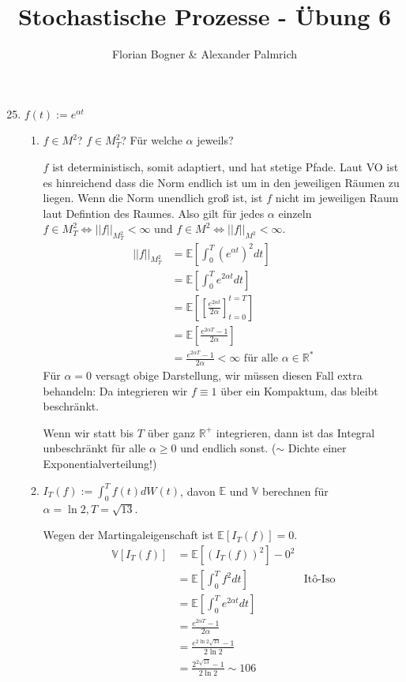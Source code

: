 \documentclass[a4paper,11pt,notitlepage,fullpage]{article}
\newcommand{\E}{\mathbb E}
\newcommand{\Ee}[1]{\mathbb E\left[#1\right]}
\newcommand{\V}{\mathbb V}
\newcommand{\Vv}[1]{\mathbb V\left[#1\right]}
\newcommand{\norm}[2]{\left|\left|{#1}\right|\right|_{#2}}
\begin{document}
\author{Florian Bogner \& Alexander Palmrich}
\title{Stochastische Prozesse - Übung 6}
\maketitle

\begin{enumerate}
\setcounter{enumi}{24}


\item $f(t):=e^{\alpha t}$
\begin{enumerate}
\item $f\in M^2$? $f\in M^2_T$? Für welche $\alpha$ jeweils?

$f$ ist deterministisch, somit adaptiert, und hat stetige Pfade. Laut VO ist es hinreichend dass die Norm endlich ist um in den jeweiligen Räumen zu liegen. Wenn die Norm unendlich groß ist, ist $f$ nicht im jeweiligen Raum laut Defintion des Raumes. Also gilt für jedes $\alpha$ einzeln $f\in M^2_T \Leftrightarrow \norm{f}{M^2_T}<\infty$ und $f\in M^2 \Leftrightarrow \norm{f}{M^2}<\infty$.
\begin{align*}
\norm{f}{M^2_T} &= \Ee{\int_0^T (e^{\alpha t})^2 dt}\\
&= \Ee{\int_0^T e^{2\alpha t} dt}\\
&= \Ee{\left[\frac{e^{2\alpha t}}{2\alpha}\right]_{t=0}^{t=T}}\\
&= \Ee{\frac{e^{2\alpha T}-1}{2\alpha}}\\
&= \frac{e^{2\alpha T}-1}{2\alpha} < \infty \text{ für alle } \alpha \in \mathbb{R}^*
\end{align*}
Für $\alpha=0$ versagt obige Darstellung, wir müssen diesen Fall extra behandeln: Da integrieren wir $f\equiv 1$ über ein Kompaktum, das bleibt beschränkt.

Wenn wir statt bis $T$ über ganz $\mathbb{R}^+$ integrieren, dann ist das Integral unbeschränkt für alle $\alpha\geq 0$ und endlich sonst. ($\sim$ Dichte einer Exponentialverteilung!)

\item $I_T(f):= \int_0^T f(t) dW(t)$, davon $\E$ und $\V$ berechnen für $\alpha=\ln 2, T=\sqrt{13}$.

Wegen der Martingaleigenschaft ist $\Ee{I_T(f)} = 0$.
\begin{align*}
\Vv{I_T(f)} &= \Ee{(I_T(f))^2} - 0^2\\
&=\Ee{\int_0^T f^2 dt} &\text{Itô-Iso}\\
&=\Ee{\int_0^T e^{2\alpha t} dt}\\
&= \frac{e^{2\alpha T}-1}{2\alpha}\\
&= \frac{e^{2\ln 2 \sqrt{13}}-1}{2\ln 2}\\
&= \frac{2^{2\sqrt{13}}-1}{2\ln 2} \sim 106
\end{align*}


\end{enumerate}
\end{enumerate}
\end{document}
